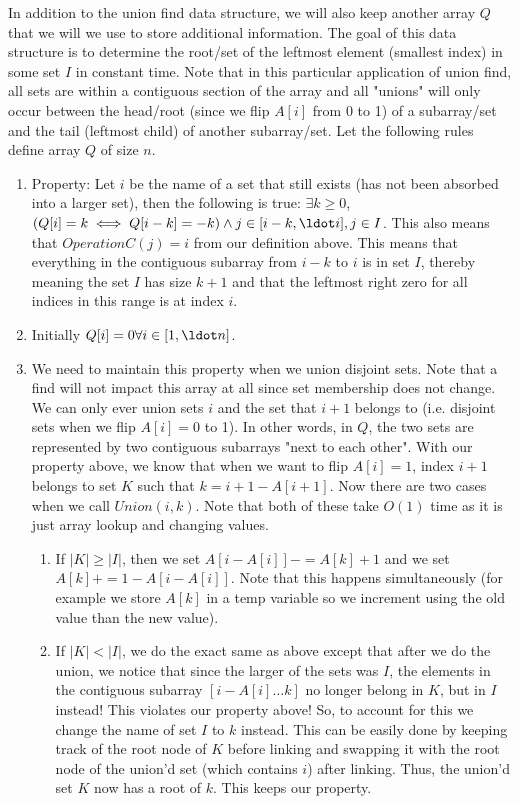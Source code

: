 \documentclass{article}
\begin{document}
In addition to the union find data structure, we will also keep another array $Q$ that we will we use to store
additional information. The goal of this data structure is to determine the root/set of the leftmost element (smallest
index) in some set $I$ in constant time. Note that in this particular application of union find, all sets are within a
contiguous section of the array and all "unions" will only occur between the head/root (since we flip $A[i]$ from 0 to
1) of a subarray/set and the tail (leftmost child) of another subarray/set. Let the following rules define array $Q$ of
size $n$.

\begin{enumerate}
    \item Property: Let $i$ be the name of a set that still exists (has not been absorbed into a larger set), then the following
        is true: $\exists k \geq 0$, $(Q[i] = k  \iff Q[i-k] = -k) \land j \in [i-k, \ldot i], j \in I$. This also means
        that $OperationC(j) = i$ from our definition above. This means that everything in the contiguous subarray
        from $i-k$ to $i$ is in set $I$, thereby meaning the set $I$ has size $k + 1$ and that the leftmost right
        zero for all indices in this range is at index $i$.
    \item Initially $Q[i] = 0 \forall i \in [1, \ldot n]$.
    \item We need to maintain this property when we union disjoint sets. Note that a find will not impact this array at
        all since set membership does not change. We can only ever union sets $i$ and the set that $i+1$ belongs to
        (i.e. disjoint sets when we flip $A[i] = 0$ to 1). In other words, in $Q$, the two sets are represented by two
        contiguous subarrays "next to each other". With our property above, we know that when we want to flip $A[i] =
        1$, index $i+1$ belongs to set $K$ such that $k= i + 1 - A[i + 1]$. Now there are two cases when we call
        $Union(i, k)$. Note that both of these take $O(1)$ time as it is just array lookup and changing values.
        \begin{enumerate}
            \item If $|K| \geq |I|$, then we set $A[i - A[i]] -= A[k] + 1$ and we set $A[k] += 1 - A[i - A[i]]$. Note
                that this happens simultaneously (for example we store $A[k]$ in a temp variable so we increment using the old
                value than the new value).
            \item If $|K| < |I|$, we do the exact same as above except that after we do the union, we notice that since
                the larger of the sets was $I$, the elements in the contiguous subarray $[i - A[i] \ldots k]$ no longer
                belong in $K$, but in $I$ instead! This violates our property above! So, to account for this we change
                the name of set $I$ to $k$ instead. This can be easily done by keeping track of the root node of $K$
                before linking and swapping it with the root node of the union'd set (which contains $i$) after linking.
                Thus, the union'd set $K$ now has a root of $k$. This keeps our property.
        \end{enumerate}
\end{enumerate}
\end{document}
